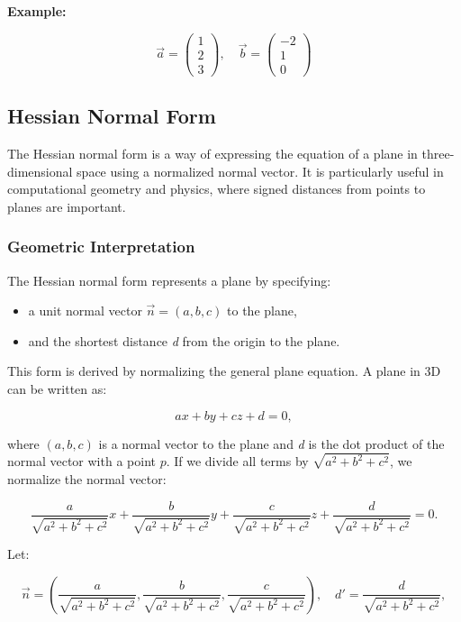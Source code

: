 \textbf{Example:}

\[
	\vec{a} = \begin{pmatrix} 1 \\ 2 \\ 3 \end{pmatrix}, \quad \vec{b} = \begin{pmatrix} -2 \\ 1 \\ 0 \end{pmatrix}
\]

\subsection{Hessian Normal Form}

The Hessian normal form is a way of expressing the equation of a plane in three-dimensional space using a normalized normal vector. It is particularly useful in computational geometry and physics, where signed distances from points to planes are important.

\subsubsection{Geometric Interpretation}

The Hessian normal form represents a plane by specifying:

\begin{itemize}
	\item a unit normal vector \(\vec{n} = (a, b, c)\) to the plane,
	\item and the shortest distance \emph{d} from the origin to the plane.
\end{itemize}

This form is derived by normalizing the general plane equation. A plane in 3D can be written as:

\[
	ax + by + cz + d = 0,
\]

where \((a, b, c)\) is a normal vector to the plane and \emph{d} is the dot product of the normal vector with a point \(p\).
If we divide all terms by \(\sqrt{a^2 + b^2 + c^2}\), we normalize the normal vector:

\[
	\frac{a}{\sqrt{a^2 + b^2 + c^2}}x + \frac{b}{\sqrt{a^2 + b^2 + c^2}}y + \frac{c}{\sqrt{a^2 + b^2 + c^2}}z + \frac{d}{\sqrt{a^2 + b^2 + c^2}} = 0.
\]

Let:

\[
	\vec{n} = \left(\frac{a}{\sqrt{a^2 + b^2 + c^2}}, \frac{b}{\sqrt{a^2 + b^2 + c^2}}, \frac{c}{\sqrt{a^2 + b^2 + c^2}}\right), \quad d' = \frac{d}{\sqrt{a^2 + b^2 + c^2}},
\]


